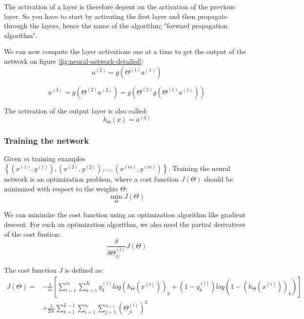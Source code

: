 The activation of a layer is therefore depent on the activation of the previous layer. So you have to start by activating the first layer and then propagate through the layers, hence the name of the algorithm; "forward propagation algorithm".

We can now compute the layer activations one at a time to get the output of the network on figure \ref{fig:neural-network-detailed}:
\begin{equation}
a^{(2)} = g(\Theta^{(1)}a^{(1)})
\end{equation}

\begin{equation}
a^{(3)} = g(\Theta^{(2)}a^{(2)}) = g(\Theta^{(2)} g(\Theta^{(1)}a^{(1)}))
\end{equation}

The activation of the output layer is also called:
\begin{equation}
h_\Theta(x) = a^{(3)}
\end{equation}

\subsubsection{Training the network}
Given $m$ training examples $\left\{(x^{(1)},y^{(1)}), (x^{(2)},y^{(2)}),\dots, (x^{(m)},y^{(m)}) \right\}$.
Training the neural network is an optimization problem, where a cost function $J(\Theta)$ should be minimized with respect to the weights $\Theta$:
\begin{equation}
\min_{\Theta} J(\Theta)
\end{equation}

We can minimize the cost function using an optimization algorithm like gradient descent. For such an optimization algorithm, we also need the partial derivatives of the cost funtion:
\begin{equation}
\frac{\delta}{\delta\Theta^{(l)}_{ij}}J(\Theta)
\end{equation}

The cost function $J$ is defined as:
\begin{equation}
\begin{split}
J(\Theta) = &-\frac{1}{m}
\left[
\sum^m_{i=1}\sum^K_{k=1}
y_k^{(i)}
log(h_\Theta(x^{(i)}))_k +
(1-y_k^{(i)})
log(1-(h_\Theta(x^{(i)}))_k)
\right] \\
&+ \frac{\lambda}{2m}
\sum^{L-1}_{k=1}
\sum^{s_l}_{i=1}
\sum^{s_{l+1}}_{j=1}
(\Theta^{(l)}_{ji})^2
\end{split}
\end{equation}

